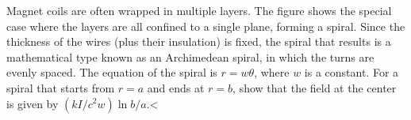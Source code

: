 Magnet coils are often wrapped in multiple layers. The figure shows the special case where the layers are all confined to a
single plane, forming a spiral. Since the thickness of the wires (plus their insulation) is fixed, the spiral that results is
a mathematical type known as an Archimedean spiral, in which the turns are evenly spaced. The equation of the
spiral is $r=w\theta$, where $w$ is a constant. For a spiral that starts from $r=a$ and ends at $r=b$, show that the field
at the center is given by $(kI/c^2w)\ln b/a$.<%
